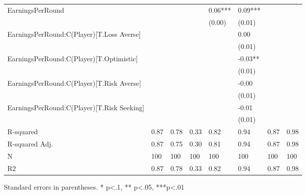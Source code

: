 \begin{table}
\begin{center}
\begin{tabular}{llllllll}
EarningsPerRound                           &              &             &           & 0.06***    & 0.09***     &                &                  \\
                                           &              &             &           & (0.00)     & (0.01)      &                &                  \\
EarningsPerRound:C(Player)[T.Loss Averse]  &              &             &           &            & 0.00        &                &                  \\
                                           &              &             &           &            & (0.01)      &                &                  \\
EarningsPerRound:C(Player)[T.Optimistic]   &              &             &           &            & -0.03**     &                &                  \\
                                           &              &             &           &            & (0.01)      &                &                  \\
EarningsPerRound:C(Player)[T.Risk Averse]  &              &             &           &            & -0.00       &                &                  \\
                                           &              &             &           &            & (0.01)      &                &                  \\
EarningsPerRound:C(Player)[T.Risk Seeking] &              &             &           &            & -0.01       &                &                  \\
                                           &              &             &           &            & (0.01)      &                &                  \\
R-squared                                  & 0.87         & 0.78        & 0.33      & 0.82       & 0.94        & 0.87           & 0.98             \\
R-squared Adj.                             & 0.87         & 0.75        & 0.30      & 0.81       & 0.94        & 0.87           & 0.98             \\
N                                          & 100          & 100         & 100       & 100        & 100         & 100            & 100              \\
R2                                         & 0.87         & 0.78        & 0.33      & 0.82       & 0.94        & 0.87           & 0.98             \\
\hline
\end{tabular}
\end{center}
\end{table}
\bigskip
Standard errors in parentheses. \newline 
* p<.1, ** p<.05, ***p<.01